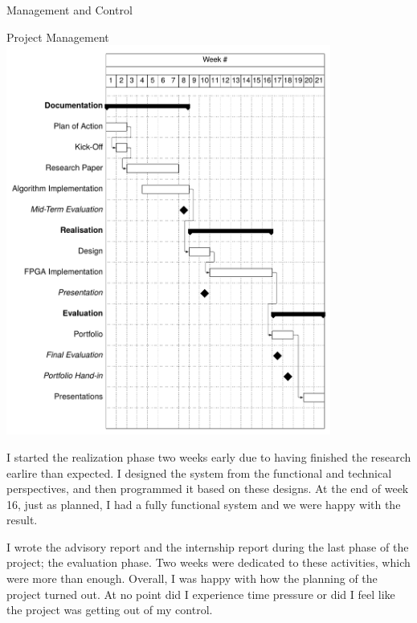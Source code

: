 \documentclass{matthijs}
\begin{document}
\begin{hoofdstuk}{Management and Control}
\begin{paragraaf}{Project Management}
			\vspace{0.65ex}
			\includegraphics[width=0.8\textwidth, clip, trim=0cm 6.5cm 0cm 8.5cm]{planning.pdf}
			\vspace{0.4ex}

			\noindent I started the realization phase two weeks early due to having finished the research earlire than expected.
			I designed the system from the functional and technical perspectives, and then programmed it based on these designs.
			At the end of week 16, just as planned, I had a fully functional system and we were happy with the result.

			\noindent I wrote the advisory report and the internship report during the last phase of the project; the evaluation phase.
			Two weeks were dedicated to these activities, which were more than enough.
			Overall, I was happy with how the planning of the project turned out.
			At no point did I experience time pressure or did I feel like the project was getting out of my control.
			

\end{paragraaf}
\end{hoofdstuk}
\end{document}
